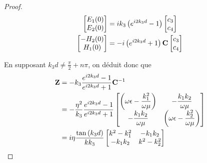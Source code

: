 \begin{proof}
            \begin{align}
                \begin{bmatrix}
                    E_1(0)\\
                    E_2(0)\\
                \end{bmatrix}
                &=ik_3\left( e^{i2k_3 d} -1 \right)
                \begin{bmatrix}
                    c_3 \\
                    c_4
                \end{bmatrix} \\
                \begin{bmatrix}
                    -H_2(0)\\
                    H_1(0)\\
                \end{bmatrix}
                & = - i\left(e^{i2k_3 d} +1 \right)
                \mathbf{C}
                \begin{bmatrix}
                c_3 \\
                c_4
                \end{bmatrix}
            \end{align}

            En supposant $k_3d \not = \frac{\pi}{2} + n\pi$, on déduit donc que
            \begin{align}
                \mathbf{Z} &=  - k_3 \dfrac{e^{i2k_3d} -1}{e^{i2k_3d} +1} \mathbf{C}^{-1} 
                \\
                &= -\dfrac{\eta^2}{k_3} \dfrac{e^{i2k_3d} -1}{e^{i2k_3d} +1}
                    \begin{bmatrix}
                       \left(\omega\epsilon-\dfrac{k_1^2}{\omega\mu}\right)  & -\dfrac{k_1k_2}{\omega\mu}\\
                        -\dfrac{k_1k_2}{\omega\mu} &  \left(\omega\epsilon-\dfrac{k_2^2}{\omega\mu}\right)
                    \end{bmatrix}
                \\
                &= i\eta\dfrac{\tan\left(k_3d\right)}{kk_3}
                    \begin{bmatrix}
                       k^2-k_1^2  & -k_1k_2\\
                        -k_1k_2 & k^2-k_2^2\\
                    \end{bmatrix}
            \end{align}

        \end{proof}

